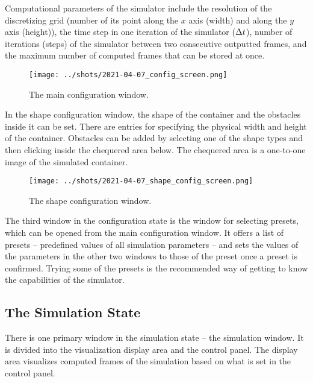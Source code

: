 \documentclass[11pt,a4paper,twoside,openright]{report}
\begin{document}
Computational parameters of the simulator include the resolution of the discretizing grid (number of its point along the $x$ axis (width) and along the $y$ axis (height)), the time step in one iteration of the simulator ($\Delta t$), number of iterations (steps) of the simulator between two consecutive outputted frames, and the maximum number of computed frames that can be stored at once.

\begin{figure}[h]
	\centering
	\texttt{[image: ../shots/2021-04-07\_config\_screen.png]}
	\caption{The main configuration window.}
\end{figure}

In the shape configuration window, the shape of the container and the obstacles inside it can be set. There are entries for specifying the physical width and height of the container. Obstacles can be added by selecting one of the shape types and then clicking inside the chequered area below. The chequered area is a one-to-one image of the simulated container.

\begin{figure}[h]
	\centering
	\texttt{[image: ../shots/2021-04-07\_shape\_config\_screen.png]}
	\caption{The shape configuration window.}
\end{figure}

The third window in the configuration state is the window for selecting presets, which can be opened from the main configuration window. It offers a list of presets -- predefined values of all simulation parameters -- and sets the values of the parameters in the other two windows to those of the preset once a preset is confirmed. Trying some of the presets is the recommended way of getting to know the capabilities of the simulator.

\subsection{The Simulation State}
There is one primary window in the simulation state -- the simulation window. It is divided into the visualization display area and the control panel. The display area visualizes computed frames of the simulation based on what is set in the control panel.
\end{document}
